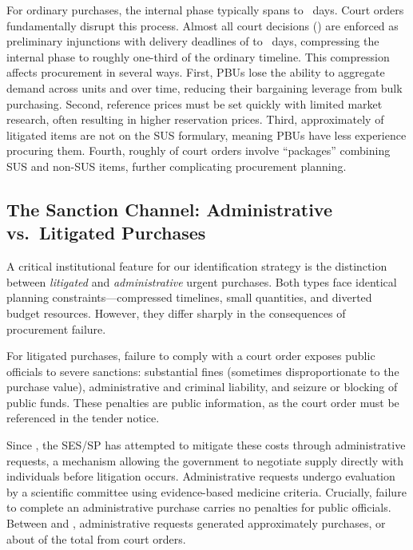 For ordinary purchases, the internal phase typically spans \BPordPlanLow{} to \BPordPlanHigh~days. Court orders fundamentally disrupt this process. Almost all court decisions (\BPinjunctionShare) are enforced as preliminary injunctions with delivery deadlines of \BPurgentPlanLow{} to \BPurgentPlanHigh~days, compressing the internal phase to roughly one-third of the ordinary timeline. This compression affects procurement in several ways. First, PBUs lose the ability to aggregate demand across units and over time, reducing their bargaining leverage from bulk purchasing. Second, reference prices must be set quickly with limited market research, often resulting in higher reservation prices. Third, approximately \BPnotOnSUSshare{} of litigated items are not on the SUS formulary, meaning PBUs have less experience procuring them. Fourth, roughly \BPpackageShare{} of court orders involve ``packages'' combining SUS and non-SUS items, further complicating procurement planning.

\subsection{The Sanction Channel: Administrative vs.\ Litigated Purchases}
\label{sec:sanction_channel}

A critical institutional feature for our identification strategy is the distinction between \textit{litigated} and \textit{administrative} urgent purchases. Both types face identical planning constraints---compressed timelines, small quantities, and diverted budget resources. However, they differ sharply in the consequences of procurement failure.

For litigated purchases, failure to comply with a court order exposes public officials to severe sanctions: substantial fines (sometimes disproportionate to the purchase value), administrative and criminal liability, and seizure or blocking of public funds. These penalties are public information, as the court order must be referenced in the tender notice.

Since \BPsampleStartYear, the SES/SP has attempted to mitigate these costs through administrative requests, a mechanism allowing the government to negotiate supply directly with individuals before litigation occurs. Administrative requests undergo evaluation by a scientific committee using evidence-based medicine criteria. Crucially, failure to complete an administrative purchase carries no penalties for public officials. Between \BPsampleStartYear{} and \BPsampleEndYear, administrative requests generated approximately \BPadminPurchasesTotal{} purchases, or about \BPadminToCourtShare{} of the total from court orders.

